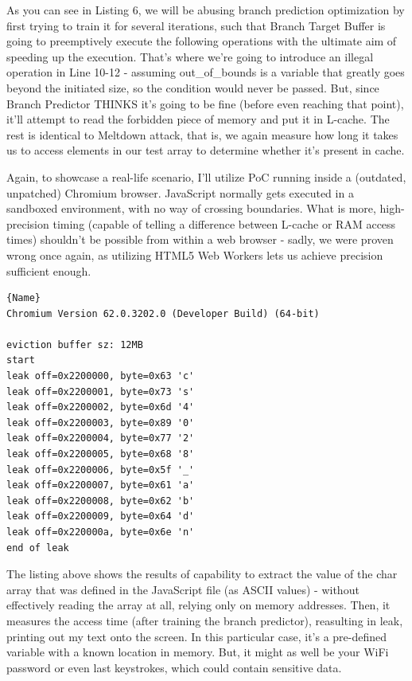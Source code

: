 \documentclass{article}
\begin{document}
As you can see in Listing 6, we will be abusing branch prediction optimization by first trying to train it for several iterations, such that Branch Target Buffer is going to preemptively execute the following operations with the ultimate aim of speeding up the execution. That's where we're going to introduce an illegal operation in Line 10-12 - assuming out\_of\_bounds is a variable that greatly goes beyond the initiated size, so the condition would never be passed. But, since Branch Predictor THINKS it's going to be fine (before even reaching that point), it'll attempt to read the forbidden piece of memory and put it in L-cache. The rest is identical to Meltdown attack, that is, we again measure how long it takes us to access elements in our test array to determine whether it's present in cache.


Again, to showcase a real-life scenario, I'll utilize PoC running inside a (outdated, unpatched) Chromium browser. JavaScript normally gets executed in a sandboxed environment, with no way of crossing boundaries. What is more, high-precision timing (capable of telling a difference between L-cache or RAM access times) shouldn't be possible from within a web browser - sadly, we were proven wrong once again, as utilizing HTML5 Web Workers lets us achieve precision sufficient enough. 

\begin{lstlisting}[caption=Javascript leaking memory\cite{spectrechrome},frame=tlrb]{Name}
Chromium Version 62.0.3202.0 (Developer Build) (64-bit)

eviction buffer sz: 12MB
start
leak off=0x2200000, byte=0x63 'c'
leak off=0x2200001, byte=0x73 's'
leak off=0x2200002, byte=0x6d '4'
leak off=0x2200003, byte=0x89 '0'
leak off=0x2200004, byte=0x77 '2'
leak off=0x2200005, byte=0x68 '8' 
leak off=0x2200006, byte=0x5f '_'
leak off=0x2200007, byte=0x61 'a'
leak off=0x2200008, byte=0x62 'b'
leak off=0x2200009, byte=0x64 'd'
leak off=0x220000a, byte=0x6e 'n'
end of leak
\end{lstlisting}
The listing above shows the results of capability to extract the value of the char array that was defined in the JavaScript file (as ASCII values) - without effectively reading the array at all, relying only on memory addresses. Then, it measures the access time (after training the branch predictor), reasulting in leak, printing out my text onto the screen. In this particular case, it's a pre-defined variable with a known location in memory. But, it might as well be your WiFi password or even last keystrokes, which could contain sensitive data. 
\end{document}
